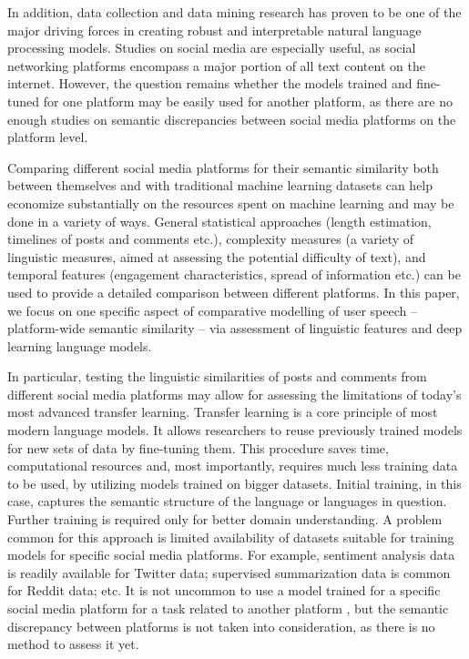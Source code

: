 In addition, data collection and data mining research has proven to be one of the major driving forces in creating robust and interpretable natural language processing models. Studies on social media are especially useful, as social networking platforms encompass a major portion of all text content on the internet. However, the question remains whether the models trained and fine-tuned for one platform may be easily used for another platform, as there are no enough studies on semantic discrepancies between social media platforms on the platform level.

Comparing different social media platforms for their semantic similarity both between themselves and with traditional machine learning datasets can help economize substantially on the resources spent on machine learning and may be done in a variety of ways. General statistical approaches (length estimation, timelines of posts and comments etc.), complexity measures (a variety of linguistic measures, aimed at assessing the potential difficulty of text), and temporal features (engagement characteristics, spread of information etc.) can be used to provide a detailed comparison between different platforms. In this paper, we focus on one specific aspect of comparative modelling of user speech --platform-wide semantic similarity -- via assessment of linguistic features and deep learning language models.

In particular, testing the linguistic similarities of posts and comments from different social media platforms may allow for assessing the limitations of today’s most advanced transfer learning. Transfer learning \cite{ZhuangQi} is a core principle of most modern language models. It allows researchers to reuse previously trained models for new sets of data by fine-tuning them. This procedure saves time, computational resources and, most importantly, requires much less training data to be used, by utilizing models trained on bigger datasets. Initial training, in this case, captures the semantic structure of the language or languages in question. Further training is required only for better domain understanding. A problem common for this approach is limited availability of datasets suitable for training models for specific social media platforms. For example, sentiment analysis data is readily available for Twitter data; supervised summarization data is common for Reddit data; etc. It is not uncommon to use a model trained for a specific social media platform for a task related to another platform \cite{BlekanovTarasovBodrunova}, but the semantic discrepancy between platforms is not taken into consideration, as there is no method to assess it yet.

